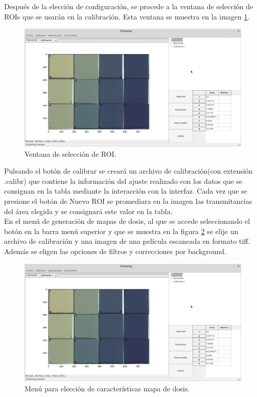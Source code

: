 Después de la elección de configuración, se procede a la ventana de selección de ROIs que se usarán en la calibración. Esta ventana se muestra en la imagen \ref{fig:menuEleccionDosis}.
\begin{figure}[H]
	\centering
	\includegraphics[width=0.7\linewidth]{images/imagenesDocumentacion/menuEleccionDosis.png}
	\caption{Ventana de selección de ROI. }
	\label{fig:menuEleccionDosis}
\end{figure}
Pulsando el botón de calibrar se creará un archivo de calibración(con extensión .calibr) que contiene la información del ajuste realizado con los datos que se consignan en la tabla mediante la interacción con la interfaz. Cada vez que se presione el botón de Nuevo ROI se promediara en la imagen las transmitancias del área elegida y se consignará este valor en la tabla.\\

En el menú de generación de mapas de dosis, al que se accede seleccionando el botón en la barra menú superior y que se muestra en la figura \ref{fig:menuMapaDosis} se elije un archivo de calibración y una imagen de una película escaneada en formato tiff. Además se eligen las opciones de filtros y correcciones por background.\\
\begin{figure}[H]
	\centering
	\includegraphics[width=0.7\linewidth]{images/imagenesDocumentacion/menuEleccionDosis.png}
	\caption{Menú para elección de características mapa de dosis. }
	\label{fig:menuMapaDosis}
\end{figure}

